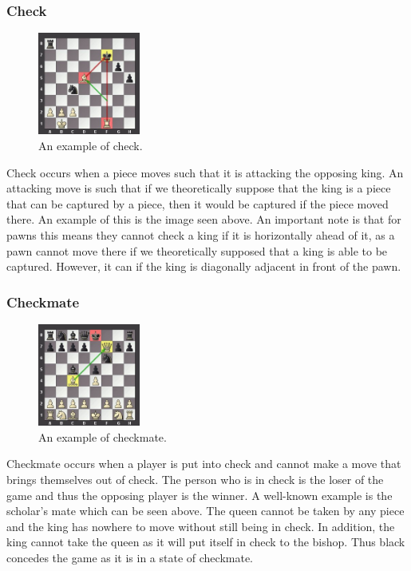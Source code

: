 \subsubsection{Check}
\begin{figure}[H]
\centering
	\includegraphics[width=0.3\textwidth]{images/boards/check_example}
	\caption{An example of check.}
\end{figure}
Check occurs when a piece moves such that it is attacking the opposing king. An attacking move is such that if we theoretically suppose that the king is a piece that can be captured by a piece, then it would be captured if the piece moved there. An example of this is the image seen above. An important note is that for pawns this means they cannot check a king if it is horizontally ahead of it, as a pawn cannot move there if we theoretically supposed that a king is able to be captured. However, it can if the king is diagonally adjacent in front of the pawn. 
\subsubsection{Checkmate}
\begin{figure}[H]
\centering
	\includegraphics[width=0.3\textwidth]{images/boards/checkmate_example}
	\caption{An example of checkmate.}
\end{figure}
Checkmate occurs when a player is put into check and cannot make a move that brings themselves out of check. The person who is in check is the loser of the game and thus the opposing player is the winner. A well-known example is the scholar's mate which can be seen above. The queen cannot be taken by any piece and the king has nowhere to move without still being in check. In addition, the king cannot take the queen as it will put itself in check to the bishop. Thus black concedes the game as it is in a state of checkmate.
